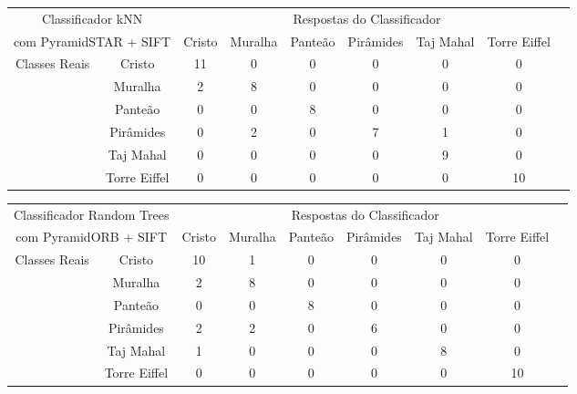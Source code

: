 \documentclass[a4paper,11pt]{article}
\begin{document}
  \hspace{-75pt}
  \begin{tabular}{|cc|c|c|c|c|c|c|c|}
    \hline
    \multicolumn{2}{|c|}{Classificador kNN} &
    \multicolumn{6}{|c|}{Respostas do Classificador} \\
    \cline{3-8}
    \multicolumn{2}{|c|}{com PyramidSTAR + SIFT}
    & Cristo & Muralha & Panteão & Pirâmides & Taj Mahal & Torre Eiffel \\
    \hline
    \multirow{6}{*}{Classes Reais}
    & \multicolumn{1}{|c|}{Cristo} & 11 & 0 & 0 & 0 & 0 & 0 \\
    \cline{2-8}
    & \multicolumn{1}{|c|}{Muralha} & 2 & 8 & 0 & 0 & 0 & 0\\
    \cline{2-8}
    & \multicolumn{1}{|c|}{Panteão} & 0 & 0 & 8 & 0 & 0 & 0\\
    \cline{2-8}
    & \multicolumn{1}{|c|}{Pirâmides} & 0 & 2 & 0 & 7 & 1 & 0\\
    \cline{2-8}
    & \multicolumn{1}{|c|}{Taj Mahal} & 0 & 0 & 0 & 0 & 9 & 0\\
    \cline{2-8}
    & \multicolumn{1}{|c|}{Torre Eiffel} & 0 & 0 & 0 & 0 & 0 & 10\\
    \hline
  \end{tabular}
  \bigskip

  \hspace{-75pt}
  \begin{tabular}{|cc|c|c|c|c|c|c|c|}
    \hline
    \multicolumn{2}{|c|}{Classificador Random Trees} &
    \multicolumn{6}{|c|}{Respostas do Classificador} \\
    \cline{3-8}
    \multicolumn{2}{|c|}{com PyramidORB + SIFT}
    & Cristo & Muralha & Panteão & Pirâmides & Taj Mahal & Torre Eiffel \\
    \hline
    \multirow{6}{*}{Classes Reais}
    & \multicolumn{1}{|c|}{Cristo} & 10 & 1 & 0 & 0 & 0 & 0 \\
    \cline{2-8}
    & \multicolumn{1}{|c|}{Muralha} & 2 & 8 & 0 & 0 & 0 & 0\\
    \cline{2-8}
    & \multicolumn{1}{|c|}{Panteão} & 0 & 0 & 8 & 0 & 0 & 0\\
    \cline{2-8}
    & \multicolumn{1}{|c|}{Pirâmides} & 2 & 2 & 0 & 6 & 0 & 0\\
    \cline{2-8}
    & \multicolumn{1}{|c|}{Taj Mahal} & 1 & 0 & 0 & 0 & 8 & 0\\
    \cline{2-8}
    & \multicolumn{1}{|c|}{Torre Eiffel} & 0 & 0 & 0 & 0 & 0 & 10\\
    \hline
  \end{tabular}
  \bigskip
\end{document}
